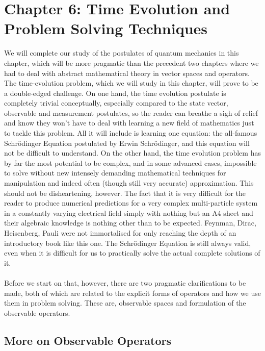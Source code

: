 \chapter{Chapter 6: Time Evolution and Problem Solving Techniques}
We will complete our study of the postulates of quantum mechanics in this chapter, which will be more pragmatic than the precedent two chapters where we had to deal with abstract mathematical theory in vector spaces and operators. The time-evolution problem, which we will study in this chapter, will prove to be a double-edged challenge. On one hand, the time evolution postulate is completely trivial conceptually, especially compared to the state vector, observable and measurement postulates, so the reader can breathe a sigh of relief and know they won't have to deal with learning a new field of mathematics just to tackle this problem. All it will include is learning one equation: the all-famous Schr\"{o}dinger Equation postulated by Erwin Schr\"{o}dinger, and this equation will not be difficult to understand. On the other hand, the time evolution problem has by far the most potential to be complex, and in some advanced cases, impossible to solve without new intensely demanding mathematical techniques for manipulation and indeed often (though still very accurate) approximation. This should not be disheartening, however. The fact that it is very difficult for the reader to produce numerical predictions for a very complex multi-particle system in a constantly varying electrical field simply with nothing but an A4 sheet and their algebraic knowledge is nothing other than to be expected. Feynman, Dirac, Heisenberg, Pauli were not immortalised for only reaching the depth of an introductory book like this one. The Schr\"{o}dinger Equation is still always valid, even when it is difficult for us to practically solve the actual complete solutions of it.
\\\\
Before we start on that, however, there are two pragmatic clarifications to be made, both of which are related to the explicit forms of operators and how we use them in problem solving. These are, observable spaces and formulation of the observable operators. 
\section{More on Observable Operators}

